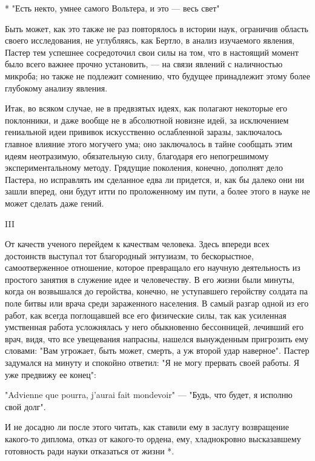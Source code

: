 * "Есть некто, умнее самого Вольтера, и это --- весь свет"

Быть может, как это также не раз повторялось в истории наук, ограничив
область  своего  исследования, не  углубляясь,  как  Бертло, в  анализ
изучаемого явления, Пастер тем успешнее сосредоточил свои силы на том,
что в  настоящий момент  было всего важнее  прочно установить,  --- на
связи явлений  с наличностью микроба;  но также не  подлежит сомнению,
что будущее принадлежит этому более глубокому анализу явления.

Итак, во всяком случае, не  в предвзятых идеях, как полагают некоторые
его  поклонники,  и даже  вообще  не  в  абсолютной новизне  идей,  за
исключением гениальной идеи  прививок искусственно ослабленной заразы,
заключалось  главное влияние  этого  могучего ума;  оно заключалось  в
тайне сообщать  этим идеям  неотразимую, обязательную  силу, благодаря
его  непогрешимому  экспериментальному   методу.  Грядущие  поколения,
конечно, дополнят  дело Пастера,  но исправлять  им сделанное  едва ли
придется, и,  как бы  далеко они  ни зашли вперед,  они будут  итти по
проложенному им  пути, а  более этого  в науке  не может  сделать даже
гений.

III

От  качеств  ученого  перейдем  к качествам  человека.  Здесь  впереди
всех достоинств  выступал тот благородный энтузиазм,  то бескорыстное,
самоотверженное отношение, которое превращало его научную деятельность
из простого занятия  в служение идее и человечеству. В  его жизни были
минуты,  когда он  возвышался  до геройства,  конечно, не  уступавшего
геройству солдата па поле битвы или врача среди зараженного населения.
В самый  разгар одной  из его  работ, как  всегда поглощавшей  все его
физические  силы, так  как усиленная  умственная работа  усложнялась у
него  обыкновенно  бессонницей,  лечивший  его  врач,  видя,  что  все
увещевания напрасны, нашелся вынужденным  пригрозить ему словами: "Вам
угрожает,  быть может,  смерть,  а уж  второй  удар наверное".  Пастер
задумался  на минуту  и спокойно  ответил: "Я  не могу  прервать своей
работы. Я уже предвижу ее конец":

"Advienne que pourra, j'aurai fait  mondevoir" --- "Будь, что будет, я
исполню свой долг".

И  не  досадно ли  после  этого  читать,  как  ставили ему  в  заслугу
возвращение  какого-то  диплома,  отказ   от  какого-то  ордена,  ему,
хладнокровно высказавшему готовность ради науки отказаться от жизни *.

